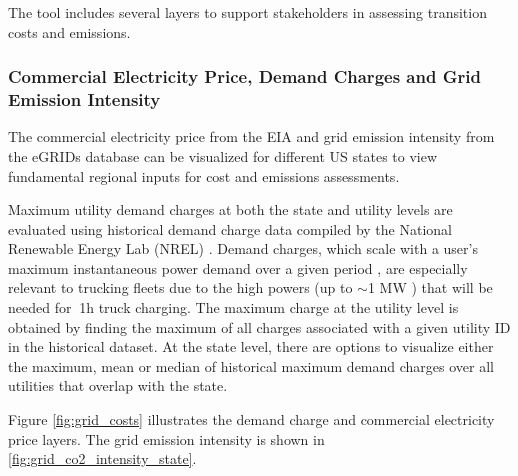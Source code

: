 The tool includes several layers to support stakeholders in assessing transition costs and emissions. 

\subsubsection{Commercial Electricity Price, Demand Charges and Grid Emission Intensity}

The commercial electricity price from the EIA \cite{EIA_2024} and grid emission intensity from the eGRIDs database \cite{eGRID_2022} can be visualized for different US states to view fundamental regional inputs for cost and emissions assessments. 

Maximum utility demand charges at both the state and utility levels are evaluated using historical demand charge data compiled by the National Renewable Energy Lab (NREL) \cite{McLaren_2017}. Demand charges, which scale with a user's maximum instantaneous power demand over a given period \cite{FEMP_DemandCharge}, are especially relevant to trucking fleets due to the high powers (up to $\sim$1 MW \cite{Moorthy_2022}) that will be needed for $~$1h truck charging. The maximum charge at the utility level is obtained by finding the maximum of all charges associated with a given utility ID in the historical dataset. At the state level, there are options to visualize either the maximum, mean or median of historical maximum demand charges over all utilities that overlap with the state. 

Figure \ref{fig:grid_costs} illustrates the demand charge and  commercial electricity price layers. The grid emission intensity is shown in \ref{fig:grid_co2_intensity_state}.

